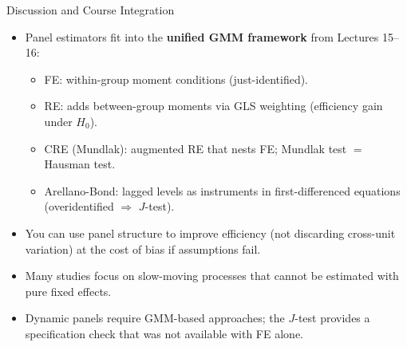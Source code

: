\documentclass[aspectratio=169, handout, t]{beamer}
\numberwithin{equation}{section}
\begin{document}
\begin{frame}{Discussion and Course Integration}
\begin{itemize}
\item Panel estimators fit into the \textbf{unified GMM framework} from Lectures 15--16:
\begin{itemize}
\item FE: within-group moment conditions (just-identified).
\item RE: adds between-group moments via GLS weighting (efficiency gain under $H_0$).
\item CRE (Mundlak): augmented RE that nests FE; Mundlak test $=$ Hausman test.
\item Arellano-Bond: lagged levels as instruments in first-differenced equations (overidentified $\Rightarrow$ $J$-test).
\end{itemize}\pause
\item You can use panel structure to improve efficiency (not discarding cross-unit variation) at the cost of bias if assumptions fail.
\item Many studies focus on slow-moving processes that cannot be estimated with pure fixed effects.
\item Dynamic panels require GMM-based approaches; the $J$-test provides a specification check that was not available with FE alone.
\end{itemize}
\end{frame}
%
%
%
\end{document}
